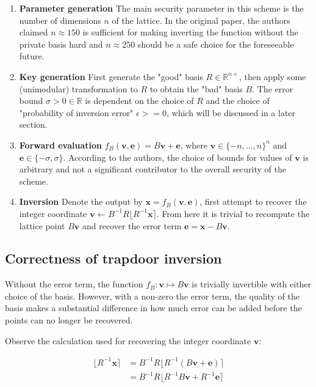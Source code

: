 \begin{enumerate}
    \item \textbf{Parameter generation} The main security parameter in this scheme is the number of dimensions $n$ of the lattice. In the original paper, the authors claimed $n \approx 150$ is sufficient for making inverting the function without the private basis hard and $n \approx 250$ should be a safe choice for the foreseeable future.
    \item \textbf{Key generation} First generate the "good" basis $R \in \mathbb{R}^{n \times }$, then apply some (unimodular) transformation to $R$ to obtain the "bad" basis $B$. The error bound $\sigma > 0 \in \mathbb{R}$ is dependent on the choice of $R$ and the choice of "probability of inversion error" $\epsilon >= 0$, which will be discussed in a later section.
    \item \textbf{Forward evaluation} $f_{B}(\mathbf{v}, \mathbf{e}) = B\mathbf{v} + \mathbf{e}$, where $\mathbf{v} \in \{-n, \ldots, n\}^n$ and $\mathbf{e} \in \{-\sigma, \sigma\}$. According to the authors, the choice of bounds for values of $\mathbf{v}$ is arbitrary and not a significant contributor to the overall security of the scheme.
    \item \textbf{Inversion} Denote the output by $\mathbf{x} = f_{B}(\mathbf{v}, \mathbf{e})$, first attempt to recover the integer coordinate $\mathbf{v} \leftarrow B^{-1}R\lfloor R^{-1}\mathbf{x} \rceil$. From here it is trivial to recompute the lattice point $B\mathbf{v}$ and recover the error term $\mathbf{e} = \mathbf{x} - B\mathbf{v}$.
\end{enumerate}

\subsection{Correctness of trapdoor inversion}
Without the error term, the function $f_B: \mathbf{v} \mapsto B\mathbf{v}$ is trivially invertible with either choice of the basis. However, with a non-zero the error term, the quality of the basis makes a substantial difference in how much error can be added before the points can no longer be recovered.

Observe the calculation used for recovering the integer coordinate $\mathbf{v}$:

$$
\begin{aligned}
\lfloor R^{-1}\mathbf{x} \rceil &= B^{-1}R\lfloor R^{-1}(B\mathbf{v} + \mathbf{e})\rceil \\
&= B^{-1}R\lfloor R^{-1}B\mathbf{v} + R^{-1}\mathbf{e}\rceil
\end{aligned}
$$

